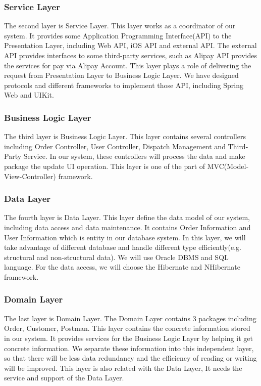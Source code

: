 \documentclass[12pt]{scrreprt}
\begin{document}
\subsubsection{Service Layer}
The second layer is Service Layer. This layer works as a coordinator of our system. It provides some Application Programming Interface(API) to the Presentation Layer, including Web API, iOS API and external API. The external API provides interfaces to some third-party services, such as Alipay API provides the services for pay via Alipay Account. This layer plays a role of delivering the request from Presentation Layer to Business Logic Layer. We have designed protocols and different frameworks to implement those API, including Spring Web and UIKit.
\subsubsection{Business Logic Layer}
The third layer is Business Logic Layer. This layer contains several controllers including Order Controller, User Controller, Dispatch Management and Third-Party Service. In our system, these controllers will process the data and make package the update UI operation. This layer is one of the part of MVC(Model-View-Controller) framework.
\subsubsection{Data Layer}
The fourth layer is Data Layer. This layer define the data model of our system, including data access and data maintenance. It contains Order Information and User Information which is entity in our database system. In this layer, we will take advantage of different database and handle different type efficiently(e.g. structural and non-structural data). We will use Oracle DBMS and SQL language. For the data access, we will choose the Hibernate and NHibernate framework.
\subsubsection{Domain Layer}
The last layer is Domain Layer. The Domain Layer contains $3$ packages including Order, Customer, Postman. This layer contains the concrete information stored in our system. It provides services for the Business Logic Layer by helping it get concrete information. We separate these information into this independent layer, so that there will be less data redundancy and the efficiency of reading or writing will be improved. This layer is also related with the Data Layer, It needs the service and support of the Data Layer.
\end{document}
